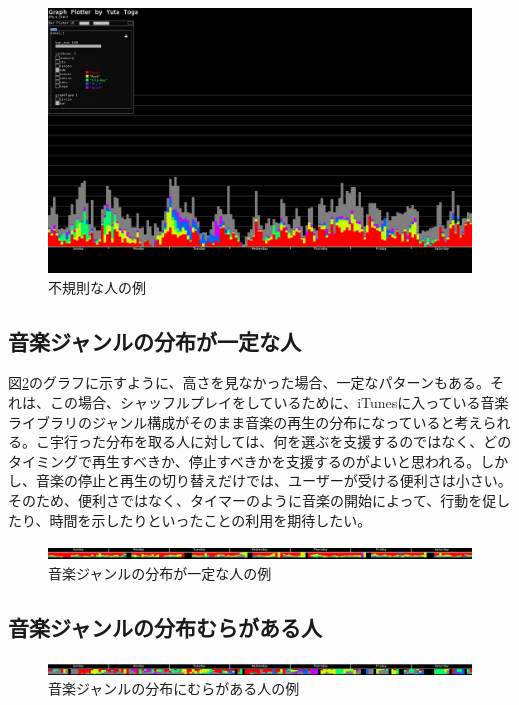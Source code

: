 \documentclass{jsarticle}
\begin{document}
\begin{figure}[h]
\begin{center}
\includegraphics[width=14cm]{sample_irregular.jpg}
\caption{不規則な人の例}
\label{sample_irregular}
\end{center}
\end{figure}

\subsection{音楽ジャンルの分布が一定な人}
図\ref{genreMap_regular}のグラフに示すように、高さを見なかった場合、一定なパターンもある。それは、この場合、シャッフルプレイをしているために、iTunesに入っている音楽ライブラリのジャンル構成がそのまま音楽の再生の分布になっていると考えられる。こ宇行った分布を取る人に対しては、何を選ぶを支援するのではなく、どのタイミングで再生すべきか、停止すべきかを支援するのがよいと思われる。しかし、音楽の停止と再生の切り替えだけでは、ユーザーが受ける便利さは小さい。そのため、便利さではなく、タイマーのように音楽の開始によって、行動を促したり、時間を示したりといったことの利用を期待したい。

\begin{figure}[h]
\begin{center}
\includegraphics[width=14cm]{genreMap_regular.jpg}
\caption{音楽ジャンルの分布が一定な人の例}
\label{genreMap_regular}
\end{center}
\end{figure}

\subsection{音楽ジャンルの分布むらがある人}
\begin{figure}[h]
\begin{center}
\includegraphics[width=14cm]{genreMap_irregular.jpg}
\caption{音楽ジャンルの分布にむらがある人の例}
\label{genreMap_irregular}
\end{center}
\end{figure}
\end{document}
